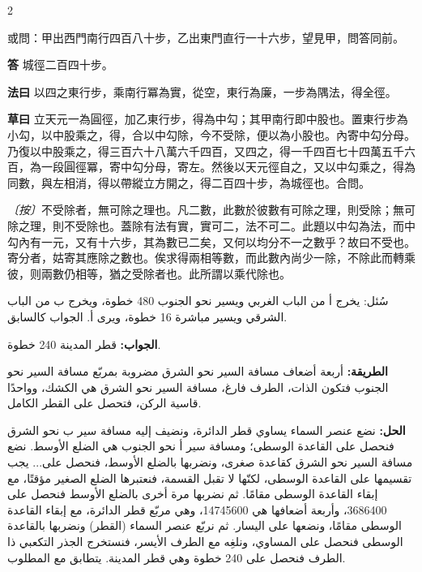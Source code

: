 \documentclass[11pt,a4paper]{article}
\newcommand{\ar}[1]{\arabicfont\beginR #1\endR}
\newcommand{\Answer}[1]{\par\noindent\textbf{\color{problemcolor}答} #1\par}
\newcommand{\Method}[1]{\par\noindent\textbf{\color{problemcolor}法曰} #1\par}
\newcommand{\Workings}[1]{\par\noindent\textbf{\color{problemcolor}草曰} #1\par}
\newcommand{\Remark}[1]{\par\noindent\textit{〔按〕}#1\par}
\newcommand{\AnswerAr}{\par\noindent\textbf{\color{problemcolor}\ar{الجواب:}} }
\newcommand{\MethodAr}{\par\noindent\textbf{\color{problemcolor}\ar{الطريقة:}} }
\newcommand{\WorkingsAr}{\par\noindent\textbf{\color{problemcolor}\ar{الحل:}} }
\begin{document}
\begin{paracol}{2}

\noindent 或問：甲出西門南行四百八十步，乙出東門直行一十六步，望見甲，問答同前。

\vspace{0.2cm}

\Answer{城徑二百四十步。}

\vspace{0.2cm}

\Method{以四之東行步，乘南行冪為實，從空，東行為廉，一步為隅法，得全徑。}

\vspace{0.2cm}

\Workings{立天元一為圓徑，加乙東行步，得為中勾；其甲南行即中股也。置東行步為小勾，以中股乘之，得，合以中勾除，今不受除，便以為小股也。內寄中勾分母。乃復以中股乘之，得三百六十八萬六千四百，又四之，得一千四百七十四萬五千六百，為一段圓徑冪，寄中勾分母，寄左。然後以天元徑自之，又以中勾乘之，得為同數，與左相消，得以帶縱立方開之，得二百四十步，為城徑也。合問。}

\vspace{0.2cm}

\Remark{不受除者，無可除之理也。凡二數，此數於彼數有可除之理，則受除；無可除之理，則不受除也。蓋除有法有實，實可二，法不可二。此題以中勾為法，而中勾內有一元，又有十六步，其為數已二矣，又何以均分不一之數乎？故曰不受也。寄分者，姑寄其應除之數也。俟求得兩相等數，而此數內尚少一除，不除此而轉乘彼，则兩數仍相等，猶之受除者也。此所謂以乘代除也。}

\switchcolumn

\ar{سُئل: يخرج أ من الباب الغربي ويسير نحو الجنوب 480 خطوة، ويخرج ب من الباب الشرقي ويسير مباشرة 16 خطوة، ويرى أ. الجواب كالسابق.}

\vspace{0.2cm}

\AnswerAr{قطر المدينة 240 خطوة.}

\vspace{0.2cm}

\MethodAr{أربعة أضعاف مسافة السير نحو الشرق مضروبة بمربّع مسافة السير نحو الجنوب فتكون الذات، الطرف فارغ، مسافة السير نحو الشرق هي الكشك، وواحدًا قاسية الركن، فتحصل على القطر الكامل.}

\vspace{0.2cm}

\WorkingsAr{نضع عنصر السماء يساوي قطر الدائرة، ونضيف إليه مسافة سير ب نحو الشرق فنحصل على القاعدة الوسطى؛ ومسافة سير أ نحو الجنوب هي الضلع الأوسط. نضع مسافة السير نحو الشرق كقاعدة صغرى، ونضربها بالضلع الأوسط، فنحصل على... يجب تقسيمها على القاعدة الوسطى، لكنّها لا تقبل القسمة، فنعتبرها الضلع الصغير مؤقتًا، مع إبقاء القاعدة الوسطى مقامًا. ثم نضربها مرة أخرى بالضلع الأوسط فنحصل على 3686400، وأربعة أضعافها هي 14745600، وهي مربّع قطر الدائرة، مع إبقاء القاعدة الوسطى مقامًا، ونضعها على اليسار. ثم نربّع عنصر السماء (القطر) ونضربها بالقاعدة الوسطى فنحصل على المساوي، ونلغِه مع الطرف الأيسر، فنستخرج الجذر التكعبي ذا الطرف فنحصل على 240 خطوة وهي قطر المدينة. يتطابق مع المطلوب.}


\end{paracol}
\end{document}

